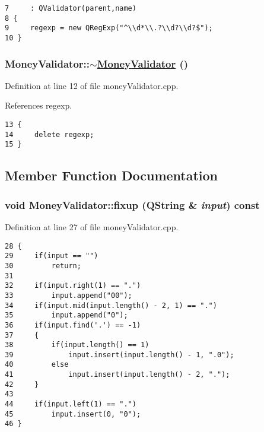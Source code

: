 \footnotesize\begin{verbatim}7     : QValidator(parent,name)
8 {
9     regexp = new QRegExp("^\\d*\\.?\\d?\\d?$");
10 }
\end{verbatim}\normalsize 


\hypertarget{classMoneyValidator_a1}{
\subsubsection[$\sim$MoneyValidator]{\setlength{\rightskip}{0pt plus 5cm}Money\-Validator::$\sim$\hyperlink{classMoneyValidator}{Money\-Validator} ()}}
\label{classMoneyValidator_a1}


Definition at line 12 of file money\-Validator.cpp.

References regexp.

\footnotesize\begin{verbatim}13 {
14     delete regexp;
15 }
\end{verbatim}\normalsize 




\subsection{Member Function Documentation}
\hypertarget{classMoneyValidator_a3}{
\subsubsection[fixup]{\setlength{\rightskip}{0pt plus 5cm}void Money\-Validator::fixup (QString \& {\em input}) const}}
\label{classMoneyValidator_a3}


Definition at line 27 of file money\-Validator.cpp.

\footnotesize\begin{verbatim}28 {
29     if(input == "")
30         return;
31 
32     if(input.right(1) == ".")
33         input.append("00");
34     if(input.mid(input.length() - 2, 1) == ".")
35         input.append("0");
36     if(input.find('.') == -1)
37     {
38         if(input.length() == 1)
39             input.insert(input.length() - 1, ".0");
40         else
41             input.insert(input.length() - 2, ".");
42     }
43 
44     if(input.left(1) == ".")
45         input.insert(0, "0");
46 }
\end{verbatim}\normalsize 



